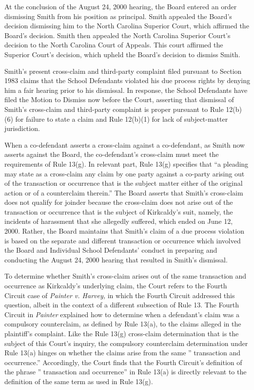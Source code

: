\documentclass[11pt,letterpaper,twoside]{article}
\begin{document}
At the conclusion of the August 24, 2000 hearing, the Board entered an
order dismissing Smith from his position as principal. Smith appealed
the Board's decision dismissing him to the North Carolina Superior
Court, which affirmed the Board's decision. Smith then appealed the
North Carolina Superior Court's decision to the North Carolina Court of
Appeals. This court affirmed the Superior Court's decision, which upheld
the Board's decision to dismiss Smith.

Smith's present cross-claim and third-party complaint filed pursuant to
Section 1983 claims that the School Defendants violated his due process
rights by denying him a fair hearing prior to his dismissal. In
response, the School Defendants have filed the Motion to Dismiss now
before the Court, asserting that dismissal of Smith's cross-claim and
third-party complaint is proper pursuant to Rule 12(b)(6) for failure to
state a claim and Rule 12(b)(1) for lack of subject-matter jurisdiction.

When a co-defendant asserts a cross-claim against a co-defendant, as
Smith now asserts against the Board, the co-defendant's cross-claim must
meet the requirements of Rule 13(g). In relevant part, Rule 13(g)
specifies that ``a pleading may state as a cross-claim any claim by one
party against a co-party arising out of the transaction or occurrence
that is the subject matter either of the original action or of a
counterclaim therein.'' The Board asserts that Smith's cross-claim does
not qualify for joinder because the cross-claim does not arise out of
the transaction or occurrence that is the subject of Kirkcaldy's suit,
namely, the incidents of harassment that she allegedly suffered, which
ended on June 12, 2000. Rather, the Board maintains that Smith's claim
of a due process violation is based on the separate and different
transaction or occurrence which involved the Board and Individual School
Defendants' conduct in preparing and conducting the August 24, 2000
hearing that resulted in Smith's dismissal.

To determine whether Smith's cross-claim arises out of the same
transaction and occurrence as Kirkcaldy's underlying claim, the Court
refers to the Fourth Circuit case of \emph{Painter v. Harvey,} in which
the Fourth Circuit addressed this question, albeit in the context of a
different subsection of Rule 13. The Fourth Circuit in \emph{Painter}
explained how to determine when a defendant's claim was a compulsory
counterclaim, as defined by Rule 13(a), to the claims alleged in the
plaintiff's complaint. Like the Rule 13(g) cross-claim determination
that is the subject of this Court's inquiry, the compulsory counterclaim
determination under Rule 13(a) hinges on whether the claims arise from
the same '' transaction and occurrence.'' Accordingly, the Court finds
that the Fourth Circuit's definition of the phrase '' transaction and
occurrence'' in Rule 13(a) is directly relevant to the definition of the
same term as used in Rule 13(g).
\end{document}
